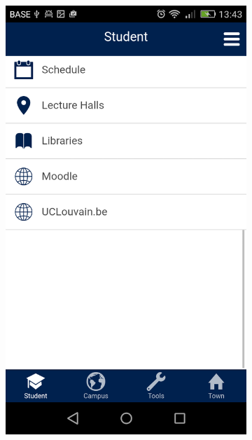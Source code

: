 \documentclass{eplmastersthesis}
\begin{document}
\begin{figure}
\begin{subfigure}[b]{0.3\textwidth}
        \includegraphics[width=\textwidth]{Images/Application_screens/Screenshot_2016-06-06-13-43-30.png}
    \end{subfigure}
\end{figure}
\end{document}

